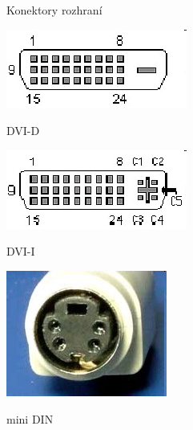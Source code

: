 \documentclass[aspectratio=43]{beamer}
\begin{document}
\begin{frame}{Konektory rozhraní}
	\begin{center}
		\begin{minipage}{0.3\linewidth}
			\centering
			\includegraphics[width=\linewidth]{extrahovane_obrazky/img_5_page3_53.png}
			\caption{DVI-D}
		\end{minipage}
		\hfill
		\begin{minipage}{0.3\linewidth}
			\centering
			\includegraphics[width=\linewidth]{extrahovane_obrazky/img_5_page3_54.png}
			\caption{DVI-I}
		\end{minipage}
		\hfill
		\begin{minipage}{0.3\linewidth}
			\centering
			\includegraphics[width=\linewidth]{extrahovane_obrazky/img_5_page3_58.jpeg}
			\caption{mini DIN}
		\end{minipage}
	\end{center}
	
\end{frame}
\end{document}
